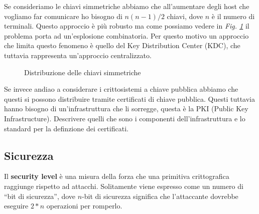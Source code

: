 \noindent
Se consideriamo le chiavi simmetriche abbiamo che all'aumentare degli host che vogliamo far comunicare ho bisogno di $n(n-1)/2$ chiavi, dove $n$ è il numero di terminali. Questo approccio è più robusto 
ma come possiamo vedere in \textit{Fig. \ref{fig:chiavi-simmetriche}} il problema porta ad un'esplosione combinatoria. Per questo motivo un approccio che limita questo 
fenomeno è quello del Key Distribution Center (KDC), che tuttavia rappresenta un'approccio centralizzato.
\begin{figure}
    \centering
    \label{fig:chiavi-simmetriche}
    \caption{Distribuzione delle chiavi simmetriche}
\end{figure}

Se invece andiao a considerare i crittosistemi a chiave pubblica abbiamo che questi si possono distribuire tramite certificati di chiave pubblica.
Questi tuttavia hanno bisogno di un'infrastruttura che li sorregge, questa è la PKI (Public Key Infrastructure).
Descrivere quelli che sono i componenti dell'infrastruttura e lo standard per la definzione dei certificati.

\subsection{Sicurezza}

Il \textbf{security level} è una misura della forza che una primitiva crittografica raggiunge rispetto ad attacchi.
Solitamente viene espresso come un numero di “bit di sicurezza”, dove $n$-bit di sicurezza significa che l'attaccante dovrebbe eseguire $2*n$ operazioni per romperlo.

